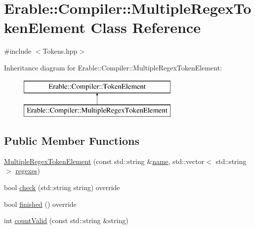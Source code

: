 \hypertarget{class_erable_1_1_compiler_1_1_multiple_regex_token_element}{}\section{Erable\+::Compiler\+::Multiple\+Regex\+Token\+Element Class Reference}
\label{class_erable_1_1_compiler_1_1_multiple_regex_token_element}


{\ttfamily \#include $<$Tokens.\+hpp$>$}

Inheritance diagram for Erable\+::Compiler\+::Multiple\+Regex\+Token\+Element\+:\begin{figure}[H]
\begin{center}
\leavevmode
\includegraphics[height=2.000000cm]{class_erable_1_1_compiler_1_1_multiple_regex_token_element}
\end{center}
\end{figure}
\subsection*{Public Member Functions}
\begin{DoxyCompactItemize}
\item 
\mbox{\hyperlink{class_erable_1_1_compiler_1_1_multiple_regex_token_element_aa2dba4d51a11bd4d278e2614a921d1fc}{Multiple\+Regex\+Token\+Element}} (const std\+::string \&\mbox{\hyperlink{class_erable_1_1_compiler_1_1_token_element_aeeb8454fbc160978c6fcb27b77ff9d90}{name}}, std\+::vector$<$ std\+::string $>$ \mbox{\hyperlink{class_erable_1_1_compiler_1_1_multiple_regex_token_element_afa320f00032296ec3da6651b879146cb}{regexes}})
\item 
bool \mbox{\hyperlink{class_erable_1_1_compiler_1_1_multiple_regex_token_element_a1896853055f44c41b3926930049be2c3}{check}} (std\+::string string) override
\item 
bool \mbox{\hyperlink{class_erable_1_1_compiler_1_1_multiple_regex_token_element_a3efc3bd3e91c6eff39a0bb97adb699bf}{finished}} () override
\item 
int \mbox{\hyperlink{class_erable_1_1_compiler_1_1_multiple_regex_token_element_a5f873018c9ed67662cca726e9f4aeabe}{count\+Valid}} (const std\+::string \&string)
\end{DoxyCompactItemize}
